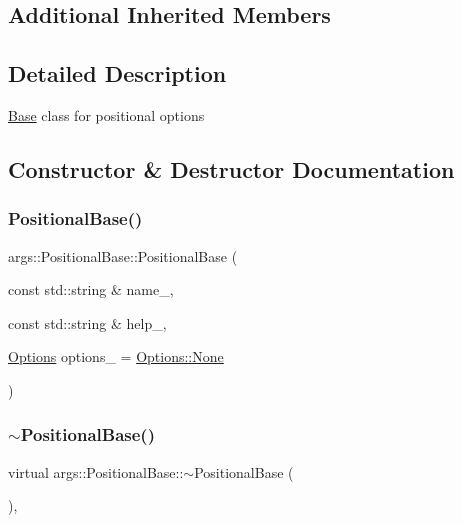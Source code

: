 \subsection*{Additional Inherited Members}


\subsection{Detailed Description}
\hyperlink{classargs_1_1_base}{Base} class for positional options 

\subsection{Constructor \& Destructor Documentation}
\mbox{\label{classargs_1_1_positional_base_a767aa51d8d20a299cd369838818d82ab}} 
\subsubsection{\texorpdfstring{Positional\+Base()}{PositionalBase()}}
{\footnotesize\ttfamily args\+::\+Positional\+Base\+::\+Positional\+Base (\begin{DoxyParamCaption}\item[{const std\+::string \&}]{name\+\_\+,  }\item[{const std\+::string \&}]{help\+\_\+,  }\item[{\hyperlink{namespaceargs_aa530c0f95194aa275f49a5f299ac9e77}{Options}}]{options\+\_\+ = {\ttfamily \hyperlink{namespaceargs_aa530c0f95194aa275f49a5f299ac9e77a6adf97f83acf6453d4a6a4b1070f3754}{Options\+::\+None}} }\end{DoxyParamCaption})\hspace{0.3cm}{\ttfamily [inline]}}

\mbox{\label{classargs_1_1_positional_base_ae6f5c9ced2da31d6818a6cfb472a063a}} 
\subsubsection{\texorpdfstring{$\sim$\+Positional\+Base()}{~PositionalBase()}}
{\footnotesize\ttfamily virtual args\+::\+Positional\+Base\+::$\sim$\+Positional\+Base (\begin{DoxyParamCaption}{ }\end{DoxyParamCaption})\hspace{0.3cm}{\ttfamily [inline]}, {\ttfamily [virtual]}}



